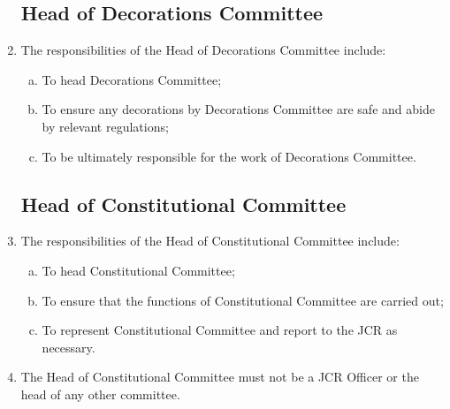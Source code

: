 \documentclass[12pt]{article}  %
\begin{document}
\begin{enumerate}
	\subsection{Head of Decorations Committee}
	\item The responsibilities of the Head of Decorations Committee include:
	\begin{enumerate}[(a)]
		\item To head Decorations Committee;
		\item To ensure any decorations by Decorations Committee are safe and abide by relevant regulations;
		\item To be ultimately responsible for the work of Decorations Committee.
	\end{enumerate}
	\subsection{Head of Constitutional Committee}
	\item The responsibilities of the Head of Constitutional Committee include:
	\begin{enumerate}[(a)]
		\item To head Constitutional Committee;
		\item To ensure that the functions of Constitutional Committee are carried out;
		\item To represent Constitutional Committee and report to the JCR as necessary.
	\end{enumerate}
	\item The Head of Constitutional Committee must not be a JCR Officer or the head of any other committee.
\end{enumerate}
\newpage
\end{document}
